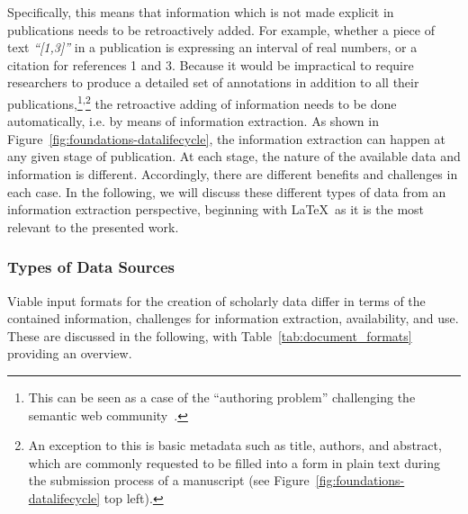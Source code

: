 Specifically, this means that information which is not made explicit in publications needs to be retroactively added. For example, whether a piece of text \textit{``[1,3]''} in a publication is expressing an interval of real numbers, or a citation for references 1 and 3. Because it would be impractical to require researchers to produce a detailed set of annotations in addition to all their publications,\footnote{This can be seen as a case of the ``authoring problem'' challenging the semantic web community~\cite{Kohlhase2010}.}\textsuperscript{,}\footnote{An exception to this is basic metadata such as title, authors, and abstract, which are commonly requested to be filled into a form in plain text during the submission process of a manuscript (see Figure~\ref{fig:foundations-datalifecycle} top left).} the retroactive adding of information needs to be done automatically, i.e. by means of information extraction. As shown in Figure~\ref{fig:foundations-datalifecycle}, the information extraction can happen at any given stage of publication. At each stage, the nature of the available data and information is different. Accordingly, there are different benefits and challenges in each case. In the following, we will discuss these different types of data from an information extraction perspective, beginning with \LaTeX\ as it is the most relevant to the presented work.

\subsubsection{Types of Data Sources}

Viable input formats for the creation of scholarly data differ in terms of the contained information, challenges for information extraction, availability, and use.
These are discussed in the following, with Table~\ref{tab:document_formats} providing an overview.

